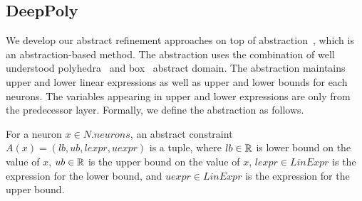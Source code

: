 \subsection{DeepPoly}
\label{sec:deeppoly}
We develop our abstract refinement approaches on top of \deeppoly{} abstraction~\cite{singh2019abstract}, 
which is an abstraction-based method. The abstraction uses the combination of
well understood polyhedra~\cite{cousot1978automatic} and box~\cite{cousot1977abstract} abstract domain.
The abstraction maintains upper and lower linear expressions as well as upper and lower bounds for each neurons.
The variables appearing in upper and lower expressions are only from the predecessor layer.
Formally, we define the abstraction as follows. 

\begin{df}
    For a neuron $x \in N.neurons$,
    an abstract constraint $A(x) = (lb,ub, lexpr, uexpr)$ is a tuple, where
    $lb \in \mathbb{R}$ is lower bound on the value of $x$,
    $ub \in \mathbb{R}$ is the upper bound on the value of  $x$,
    $lexpr \in LinExpr$ is the expression for the lower bound, and
    $uexpr \in LinExpr$ is the expression for the upper bound.
\end{df}


